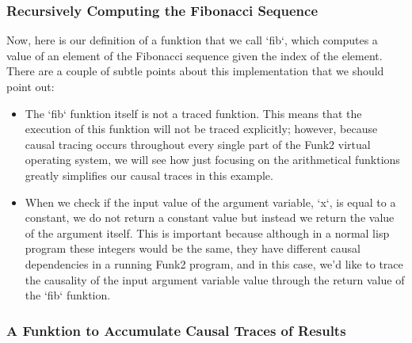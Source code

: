 \subsubsection{Recursively Computing the Fibonacci Sequence}

Now, here is our definition of a funktion that we call `fib`, which
computes a value of an element of the Fibonacci sequence given the
index of the element.  There are a couple of subtle points about this
implementation that we should point out:

\begin{itemize}
\item The `fib` funktion itself is not a traced funktion.  This means
  that the execution of this funktion will not be traced explicitly;
  however, because causal tracing occurs throughout every single part
  of the Funk2 virtual operating system, we will see how just focusing
  on the arithmetical funktions greatly simplifies our causal traces
  in this example.

\item When we check if the input value of the argument variable, `x`,
  is equal to a constant, we do not return a constant value but
  instead we return the value of the argument itself.  This is
  important because although in a normal lisp program these integers
  would be the same, they have different causal dependencies in a
  running Funk2 program, and in this case, we'd like to trace the
  causality of the input argument variable value through the return
  value of the `fib` funktion.
\end{itemize}

%
%
%

\subsubsection{A Funktion to Accumulate Causal Traces of Results}

